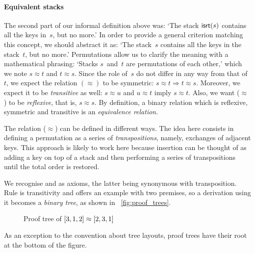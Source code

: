 \paragraph{Equivalent stacks}

The second part of our informal definition above was: `The stack
\(\textsf{isrt}(s)\) contains all the keys
in~\(s\), but no more.'  In order to provide a general criterion
matching this concept, we should abstract it as: `The stack~\(s\)
contains all the keys in the stack~\(t\), but no more.' Permutations
allow us to clarify the meaning with a mathematical phrasing: `Stacks
\(s\)~and~\(t\) are permutations of each other,' which we note \(s
\approx t\) and \(t \approx s\). Since the role of~\(s\) do not differ
in any way from that of~\(t\), we expect the relation \((\approx)\) to
be symmetric: \(s \approx t \Rightarrow t \approx s\). Moreover, we
expect it to be \emph{transitive} as well: \(s \approx u\) and \(u
\approx t\) imply \(s \approx t\). Also, we want (\(\approx\)) to be
\emph{reflexive}, that is, \(s \approx s\). By definition, a binary
relation which is reflexive, symmetric and transitive is an
\emph{equivalence relation}.

The relation (\(\approx\)) can be defined in different ways. The idea
here consists in defining a permutation as a series of
\emph{transpositions}, namely, exchanges of
adjacent keys. This approach is likely to work here because insertion
can be thought of as adding a key on top of a stack and then
performing a series of transpositions until the total order is
restored.
We recognise  and  as axioms, the latter
being synonymous with transposition. Rule  is
transitivity and offers an example with two premises, so a derivation
using it becomes a \emph{binary tree}, as shown in
\fig~\vref{fig:proof_trees}.
\begin{figure}
\centering
{}
\qquad
{}
\caption{Proof tree of \({[}3,1,2{]} \protect\approx {[}2,3,1{]}\)
\label{fig:proof_trees}}
\end{figure}
As an exception to the convention about tree layouts, proof
trees have their root at the bottom of the
figure.

